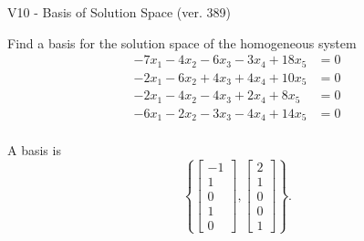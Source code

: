 \begin{exercise}
  \begin{exerciseTitle}V10 - Basis of Solution Space (ver. 389)\end{exerciseTitle}
  \begin{exerciseStatement}
    Find a basis for the solution space of the homogeneous system 
\begin{align*}
 -7 x_ 1 -4 x_ 2 -6 x_ 3 -3 x_ 4 + 18 x_ 5 &= 0  \\ 
  -2 x_ 1 -6 x_ 2 + 4 x_ 3 + 4 x_ 4 + 10 x_ 5 &= 0  \\ 
  -2 x_ 1 -4 x_ 2 -4 x_ 3 + 2 x_ 4 + 8 x_ 5 &= 0  \\ 
  -6 x_ 1 -2 x_ 2 -3 x_ 3 -4 x_ 4 + 14 x_ 5 &= 0  \\ 
 \end{align*}


 
  \end{exerciseStatement}

  \begin{exerciseAnswer}
   A basis is   
\[\left\{\left[\begin{array}{c}
-1 \\
1 \\
0 \\
1 \\
0
\end{array}\right] , \left[\begin{array}{c}
2 \\
1 \\
0 \\
0 \\
1
\end{array}\right]\right\}.\]

  


  \end{exerciseAnswer}
\end{exercise}
